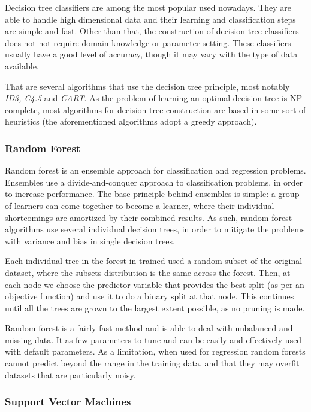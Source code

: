 Decision tree classifiers are among the most popular used nowadays. They are
able to handle high dimensional data and their learning and classification steps
are simple and fast. Other than that, the construction of decision tree
classifiers does not not require domain knowledge or parameter setting. These
classifiers usually have a good level of accuracy, though it may vary with the
type of data available.

That are several algorithms that use the decision tree principle, most notably
\textit{\textit{ID3}, C4.5} and \textit{CART}. As the problem of learning an
optimal decision tree is NP-complete, most algorithms for decision tree
construction are based in some sort of heuristics (the aforementioned algorithms
adopt a greedy approach).

\subsubsection*{Random Forest}

Random forest \cite{breiman2001random} is an ensemble approach for
classification and regression problems. Ensembles use a divide-and-conquer
approach to classification problems, in order to increase performance. The base
principle behind ensembles is simple: a group of  learners can come
together to become a  learner, where their individual shortcomings
are amortized by their combined results. As such, random forest algorithms use
several individual decision trees, in order to mitigate the problems with
variance and bias in single decision trees.

Each individual tree in the forest in trained used a random subset of the
original dataset, where the subsets distribution is the same across the forest.
Then, at each node we choose the predictor variable that provides the best split
(as per an objective function) and use it to do a binary split at that node.
This continues until all the trees are grown to the largest extent possible, as
no pruning is made.

Random forest is a fairly fast method and is able to deal with unbalanced and
missing data. It as few parameters to tune and can be easily and effectively
used with default parameters. As a limitation, when used for regression random
forests cannot predict beyond the range in the training data, and that they may
overfit datasets that are particularly noisy.

\subsubsection*{Support Vector Machines}

